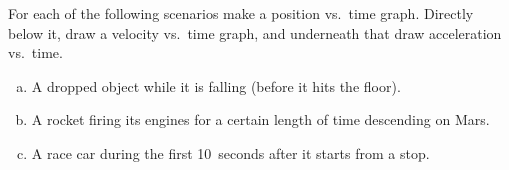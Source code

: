 \label{fnt8.2.1-2}

For each of the following scenarios make a position vs.\ time graph. Directly below it, draw a velocity vs.\ time graph, and underneath that draw acceleration vs.\ time. 

\begin{enumerate}[(a)]
	\item A dropped object while it is falling (before it hits the floor). 
	\item A rocket firing its engines for a certain length of time descending on Mars.
	\item A race car during the first 10~seconds after it starts from a stop.
\end{enumerate}